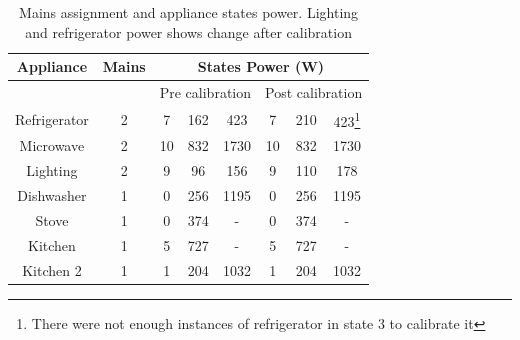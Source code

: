 \documentclass[conference]{IEEEtran}
\begin{document}

\begin{table}
\caption{Mains assignment and appliance states power. Lighting and refrigerator power shows change after calibration}
\vspace{-8pt}
\label{tab:calibration_factors}
\begin{minipage}{\columnwidth}


\begin{tabular}{|c|c|c|c|c|c|c|c|}
\hline
Appliance & Mains & \multicolumn{6}{|c|}{States Power (W)}\\
\hline
&&\multicolumn{3}{|c|}{Pre calibration}&\multicolumn{3}{|c|}{Post calibration}\\
\hline
Refrigerator & 2& 7&162&423 & 7&210&423\footnote{There were not enough instances of refrigerator in state 3 to calibrate it}\\
Microwave &2& 10&832&1730& 10&832&1730\\
Lighting & 2& 9&96&156&9&110&178\\
Dishwasher & 1& 0&256& 1195 & 0&256& 1195\\
Stove& 1 & 0&374&-& 0&374&-\\
Kitchen & 1& 5&727&-&5&727&-\\
Kitchen 2&1 & 1&204&1032&1&204&1032 \\
%
%
\hline
%
\end{tabular}
\end{minipage}
\end{table}
\end{document}
